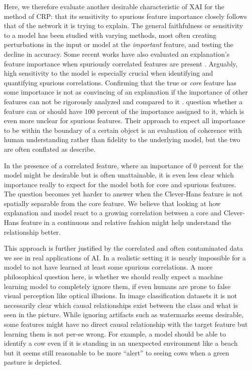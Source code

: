 Here, we therefore evaluate another desirable characteristic of XAI for the method of CRP: that its sensitivity to spurious feature importance closely follows that of the network it is trying to explain. The general faithfulness or sensitivity to a model has been studied with varying methods, most often creating perturbations in the input or model at the \textit{important} feature, and testing the decline in accuracy. Some recent works have also evaluated an explanation's feature importance when spuriously correlated features are present \citep{Yang2019,Kim2018,Parafita2019,Reimers2020,Singla2022}. Arguably, high sensitivity to the model is especially crucial when identifying and quantifying spurious correlations. Confirming that the true or \textit{core} feature has some importance is not as convincing of an explanation if the importance of other features can not be rigorously analyzed and compared to it \citep{Singla2022}. \cite{Arras2022} question whether a feature can or should have 100 percent of the importance assigned to it, which is even more unclear for spurious features. Their approach to expect all importance to be within the boundary of a certain object is an evaluation of coherence with human understanding rather than fidelity to the underlying model, but the two are often conflated as \cite{Nauta2023} describe. 

In the presence of a correlated feature, where an importance of 0 percent for the model might be desirable but is often unattainable, it is even less clear which importance really to expect for the model both for core and spurious features. The question becomes yet harder to answer when the Clever-Hans feature is not spatially separable from the core feature.
We believe that looking at how explanation and model react to a growing correlation between a core and Clever-Hans feature in a continuous and relative fashion might help understand the relationship better. 

This approach is further justified by the correlated and often contaminated data we see in real applications of AI. 
In a realistic setting it is nearly impossible for a model to not have learned at least some spurious correlations. A more philosophical question here, is whether we should really expect a machine learning model to completely ignore them, if even humans are prone to false visual perception like optical illusions. In image classification datasets it is not necessarily clear which causal relationships exist between the class and what is seen in the picture. While ignoring artifacts such as watermarks seems desirable, some features might have no direct causal relationship with the target feature but learning them is not per-se wrong. 
For example, a model should be able to identify a cow even if it is standing in an unexpected environment like a beach but it seems still reasonable to be more ``alert'' to seeing cows when a green pasture is depicted. 

